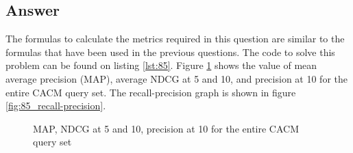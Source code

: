 \documentclass[letterpaper,11pt]{article}
\begin{document}
\subsection*{Answer}
The formulas to calculate the metrics required in this question are similar to the formulas that have been used in the previous questions. The code to solve this problem can be found on listing \ref{lst:85}. Figure \ref{fig:85_metrics} shows the value of mean average precision (MAP), average NDCG at 5 and 10, and precision at 10 for the entire CACM query set. The recall-precision graph is shown in figure \ref{fig:85_recall-precision}.

\begin{figure}[H]
	\centering
	\caption{MAP, NDCG at 5 and 10, precision at 10 for the entire CACM query set}
	\label{fig:85_metrics}
\end{figure}
\end{document}
